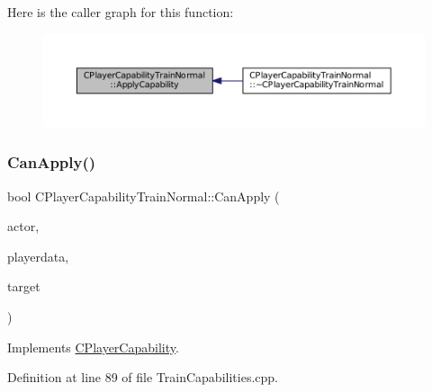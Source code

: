 Here is the caller graph for this function\+:\nopagebreak
\begin{figure}[H]
\begin{center}
\leavevmode
\includegraphics[width=350pt]{classCPlayerCapabilityTrainNormal_a04ed166d2072d44ddc96735ac1beb9bc_icgraph}
\end{center}
\end{figure}
\hypertarget{classCPlayerCapabilityTrainNormal_a625d2154bed47357f45662fe5dee7c1b}{}\label{classCPlayerCapabilityTrainNormal_a625d2154bed47357f45662fe5dee7c1b} 
\subsubsection{\texorpdfstring{Can\+Apply()}{CanApply()}}
{\footnotesize\ttfamily bool C\+Player\+Capability\+Train\+Normal\+::\+Can\+Apply (\begin{DoxyParamCaption}\item[{std\+::shared\+\_\+ptr$<$ \hyperlink{classCPlayerAsset}{C\+Player\+Asset} $>$}]{actor,  }\item[{std\+::shared\+\_\+ptr$<$ \hyperlink{classCPlayerData}{C\+Player\+Data} $>$}]{playerdata,  }\item[{std\+::shared\+\_\+ptr$<$ \hyperlink{classCPlayerAsset}{C\+Player\+Asset} $>$}]{target }\end{DoxyParamCaption})\hspace{0.3cm}{\ttfamily [virtual]}}



Implements \hyperlink{classCPlayerCapability_ae96263e0950f496492f8baeb877b9554}{C\+Player\+Capability}.



Definition at line 89 of file Train\+Capabilities.\+cpp.


